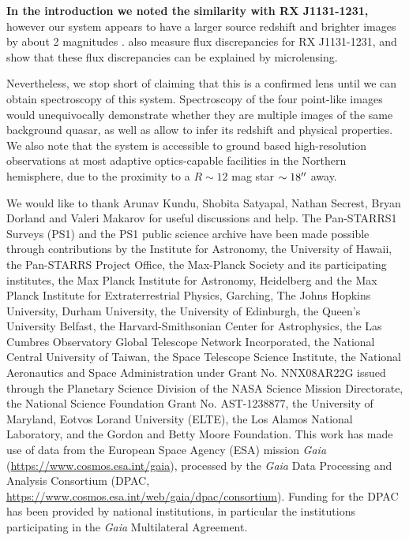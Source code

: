 \documentclass[manuscript]{aastex}
\begin{document}
{\bf In the introduction we noted the similarity with RX J1131-1231,} however our system appears to have a larger source redshift and brighter images by about 2 magnitudes \citep{slu06}. \citet{slu08} also measure flux discrepancies for RX J1131-1231, and show that these flux discrepancies can be explained by microlensing. 

Nevertheless, we stop short of claiming that this is a confirmed lens until we can obtain spectroscopy of this system. Spectroscopy of the four point-like images would unequivocally demonstrate whether they are multiple images of the same background quasar, as well as allow to infer its redshift and physical properties. We also note that the system is accessible to ground based high-resolution observations at most adaptive optics-capable facilities in the Northern hemisphere, due to the proximity to a $R\sim12$ mag star $\sim18\mbox{$^{\prime\prime}$}$ away.


\acknowledgments

We would like to thank Arunav Kundu, Shobita Satyapal, Nathan Secrest, Bryan Dorland and Valeri Makarov for useful discussions and help.
The Pan-STARRS1 Surveys (PS1) and the PS1 public science archive have been made possible through contributions by the Institute for Astronomy, the University of Hawaii, the Pan-STARRS Project Office, the Max-Planck Society and its participating institutes, the Max Planck Institute for Astronomy, Heidelberg and the Max Planck Institute for Extraterrestrial Physics, Garching, The Johns Hopkins University, Durham University, the University of Edinburgh, the Queen's University Belfast, the Harvard-Smithsonian Center for Astrophysics, the Las Cumbres Observatory Global Telescope Network Incorporated, the National Central University of Taiwan, the Space Telescope Science Institute, the National Aeronautics and Space Administration under Grant No. NNX08AR22G issued through the Planetary Science Division of the NASA Science Mission Directorate, the National Science Foundation Grant No. AST-1238877, the University of Maryland, Eotvos Lorand University (ELTE), the Los Alamos National Laboratory, and the Gordon and Betty Moore Foundation.
This work has made use of data from the European Space Agency (ESA)
mission {\it Gaia} (\url{https://www.cosmos.esa.int/gaia}), processed by
the {\it Gaia} Data Processing and Analysis Consortium (DPAC,
\url{https://www.cosmos.esa.int/web/gaia/dpac/consortium}). Funding
for the DPAC has been provided by national institutions, in particular
the institutions participating in the {\it Gaia} Multilateral Agreement.
\end{document}
